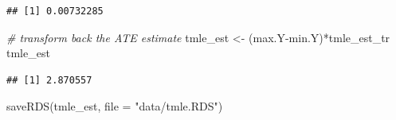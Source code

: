 \documentclass[
]{book}
\newenvironment{Shaded}{\begin{snugshade}}{\end{snugshade}}
\newcommand{\AttributeTok}[1]{\textcolor[rgb]{0.77,0.63,0.00}{#1}}
\newcommand{\CommentTok}[1]{\textcolor[rgb]{0.56,0.35,0.01}{\textit{#1}}}
\newcommand{\DecValTok}[1]{\textcolor[rgb]{0.00,0.00,0.81}{#1}}
\newcommand{\FunctionTok}[1]{\textcolor[rgb]{0.00,0.00,0.00}{#1}}
\newcommand{\NormalTok}[1]{#1}
\newcommand{\OtherTok}[1]{\textcolor[rgb]{0.56,0.35,0.01}{#1}}
\newcommand{\SpecialCharTok}[1]{\textcolor[rgb]{0.00,0.00,0.00}{#1}}
\newcommand{\StringTok}[1]{\textcolor[rgb]{0.31,0.60,0.02}{#1}}
\begin{document}
\begin{Shaded}
\end{Shaded}

\begin{verbatim}
## [1] 0.00732285
\end{verbatim}

\begin{Shaded}
\begin{Highlighting}[]
\CommentTok{\# transform back the ATE estimate}
\NormalTok{tmle\_est }\OtherTok{\textless{}{-}}\NormalTok{ (max.Y}\SpecialCharTok{{-}}\NormalTok{min.Y)}\SpecialCharTok{*}\NormalTok{tmle\_est\_tr}
\NormalTok{tmle\_est}
\end{Highlighting}
\end{Shaded}

\begin{verbatim}
## [1] 2.870557
\end{verbatim}

\begin{Shaded}
\begin{Highlighting}[]
\FunctionTok{saveRDS}\NormalTok{(tmle\_est, }\AttributeTok{file =} \StringTok{"data/tmle.RDS"}\NormalTok{)}
\end{Highlighting}
\end{Shaded}

\begin{Shaded}
\end{Shaded}
\end{document}
